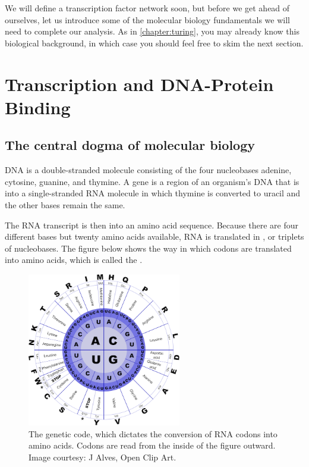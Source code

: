We will define a transcription factor network soon, but before we get ahead of ourselves, let us introduce some of the molecular biology fundamentals we will need to complete our analysis. As in \autoref{chapter:turing}, you may already know this biological background, in which case you should feel free to skim the next section.\\

\FloatBarrier
{}

\section{Transcription and DNA-Protein Binding}
\label{sec:transcription_and_dna-protein_binding}

\subsection{The central dogma of molecular biology}

DNA is a double-stranded molecule consisting of the four nucleobases adenine, cytosine, guanine, and thymine. A gene is a region of an organism's DNA that is  into a single-stranded RNA molecule in which thymine is converted to uracil and the other bases remain the same.

The RNA transcript is then  into an amino acid sequence. Because there are four different bases but twenty amino acids available, RNA is translated in , or triplets of nucleobases. The figure below shows the way in which codons are translated into amino acids, which is called the .

\begin{figure}[h]
\centering
\mySfFamily
\includegraphics[width = 0.6\textwidth]{../images/genetic_code.png}
\caption{The genetic code, which dictates the conversion of RNA codons into amino acids. Codons are read from the inside of the figure outward. Image courtesy: J Alves, Open Clip Art.}
\label{fig:genetic_code}
\end{figure}

